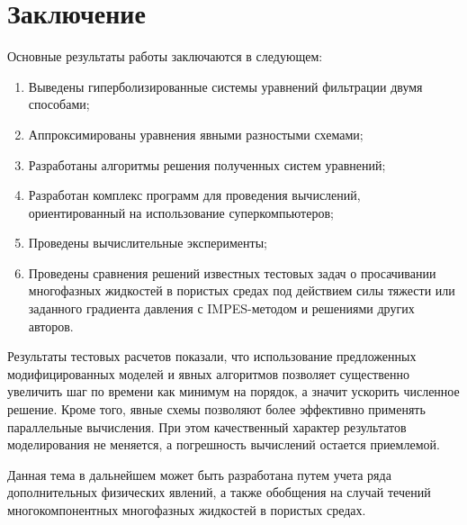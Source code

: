 \chapter*{Заключение}                       %


Основные результаты работы заключаются в следующем:
\begin{enumerate}
 \item Выведены гиперболизированные системы уравнений фильтрации двумя способами;
 \item Аппроксимированы уравнения явными разностыми схемами;
 \item Разработаны алгоритмы решения полученных систем уравнений;
 \item Разработан комплекс программ для проведения вычислений, ориентированный на использование суперкомпьютеров;
 \item Проведены вычислительные эксперименты;
 \item Проведены сравнения решений известных тестовых задач о просачивании многофазных жидкостей в пористых средах под действием силы тяжести или заданного градиента давления с IMPES-методом и решениями других авторов.
\end{enumerate}

Результаты тестовых расчетов показали, что использование предложенных модифицированных моделей и явных алгоритмов позволяет существенно увеличить шаг по времени как минимум на порядок, а значит ускорить численное решение. Кроме того, явные схемы позволяют более эффективно применять параллельные вычисления.
При этом качественный характер результатов моделирования не меняется, а погрешность вычислений остается приемлемой.

Данная тема в дальнейшем может быть разработана путем учета ряда дополнительных физических явлений, а также обобщения на случай течений многокомпонентных многофазных жидкостей в пористых средах.
